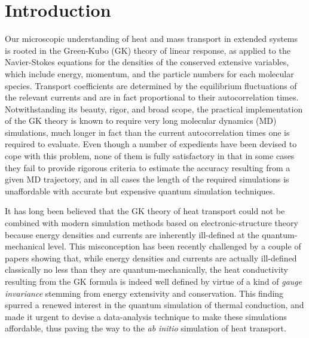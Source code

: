 \section{Introduction}
\label{sec:intro}
Our microscopic understanding of heat and mass transport in extended systems is rooted in the Green-Kubo (GK) theory of linear response,\cite{Green1954,Kubo1957} as applied to the Navier-Stokes equations for the densities of the conserved extensive variables,\cite{Kadanoff1963,Forster1975} which include energy, momentum, and the particle numbers for each molecular species. Transport coefficients are determined by the equilibrium fluctuations of the relevant currents and are in fact proportional to their autocorrelation times. Notwithstanding its beauty, rigor, and broad scope, the practical implementation of the GK theory is known to require very long molecular dynamics (MD) simulations, much longer in fact than the current autocorrelation times one is required to evaluate.\cite{Schelling2002,Nevins2007,Jones2012,Zhang2015,Oliveira2017} Even though a number of expedients have been devised to cope with this problem,\cite{Jones2012,Oliveira2017,Chen2010} none of them is fully satisfactory in that in some cases they fail to provide rigorous criteria to estimate the accuracy resulting from a given MD trajectory, and in all cases the length of the required simulations is unaffordable with accurate but expensive quantum simulation techniques.\cite{Carbogno2017}

It has long been believed that the GK theory of heat transport could not be combined with modern simulation methods based on electronic-structure theory because energy densities and currents are inherently ill-defined at the quantum-mechanical level.\cite{Stackhouse2010b} This misconception has been recently challenged by a couple of papers showing that, while energy densities and currents are actually ill-defined classically no less than they are quantum-mechanically, the heat conductivity resulting from the GK formula is indeed well defined by virtue of a kind of \emph{gauge invariance} stemming from energy extensivity and conservation.\cite{Marcolongo2016,Ercole2016} This finding spurred a renewed interest in the quantum simulation of thermal conduction,\cite{Carbogno2017,Kang2017} and made it urgent to devise a data-analysis technique to make these simulations affordable, thus paving the way to the \emph{ab initio} simulation of heat transport.

